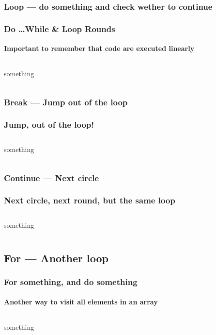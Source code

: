\documentclass[en, 11pt, xcolor=dvipsnames]{beamer}
\begin{document}
\subsubsection{Loop --- do something and check wether to continue}
\begin{frame}[fragile]
	\frametitle{Do \dots While \& Loop Rounds}
	\framesubtitle{Important to remember that code are executed linearly}

	\begin{columns}[c]
		\begin{column}{0.9\textwidth}

			something

		\end{column}
	\end{columns}

\end{frame}

\subsubsection{Break --- Jump out of the loop}
\begin{frame}[fragile]
	\frametitle{Jump, out of the loop!}

	\begin{columns}[c]
		\begin{column}{0.9\textwidth}
			something


		\end{column}
	\end{columns}

\end{frame}

\subsubsection{Continue --- Next circle}
\begin{frame}[fragile]
	\frametitle{Next circle, next round, but the same loop}

	\begin{columns}[c]
		\begin{column}{0.9\textwidth}
			something


		\end{column}
	\end{columns}

\end{frame}

\subsection{For --- Another loop}
\begin{frame}[fragile]
	\frametitle{For something, and do something}
	\framesubtitle{Another way to visit all elements in an array}

	\begin{columns}[c]
		\begin{column}{0.9\textwidth}
			something


		\end{column}
	\end{columns}

\end{frame}
\end{document}
